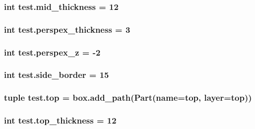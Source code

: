 \subsubsection[{mid\+\_\+thickness}]{\setlength{\rightskip}{0pt plus 5cm}int test.\+mid\+\_\+thickness = 12}\label{namespacetest_a5e58b0c7b4760f790f0c6d5e162fda87}
\hypertarget{namespacetest_aee352ece5b82d2a5c33a4ddc45c5c990}{}
\subsubsection[{perspex\+\_\+thickness}]{\setlength{\rightskip}{0pt plus 5cm}int test.\+perspex\+\_\+thickness = 3}\label{namespacetest_aee352ece5b82d2a5c33a4ddc45c5c990}
\hypertarget{namespacetest_a62e0147a9d690a7a90d3beca23dcb944}{}
\subsubsection[{perspex\+\_\+z}]{\setlength{\rightskip}{0pt plus 5cm}int test.\+perspex\+\_\+z = -\/2}\label{namespacetest_a62e0147a9d690a7a90d3beca23dcb944}
\hypertarget{namespacetest_ad2fa754f668be8d566b49d2b75c14320}{}
\subsubsection[{side\+\_\+border}]{\setlength{\rightskip}{0pt plus 5cm}int test.\+side\+\_\+border = 15}\label{namespacetest_ad2fa754f668be8d566b49d2b75c14320}
\hypertarget{namespacetest_a1dd0e7d10f3a46b2584c07bed8bc4ab8}{}
\subsubsection[{top}]{\setlength{\rightskip}{0pt plus 5cm}tuple test.\+top = box.\+add\+\_\+path(Part(name=\textquotesingle{}top\textquotesingle{}, layer=\textquotesingle{}top\textquotesingle{}))}\label{namespacetest_a1dd0e7d10f3a46b2584c07bed8bc4ab8}
\hypertarget{namespacetest_a1f1f1b6d0fb7ae6cb8e0d7a823825e8d}{}
\subsubsection[{top\+\_\+thickness}]{\setlength{\rightskip}{0pt plus 5cm}int test.\+top\+\_\+thickness = 12}\label{namespacetest_a1f1f1b6d0fb7ae6cb8e0d7a823825e8d}
\hypertarget{namespacetest_a064937db856e36c5389241650eb91307}{}
